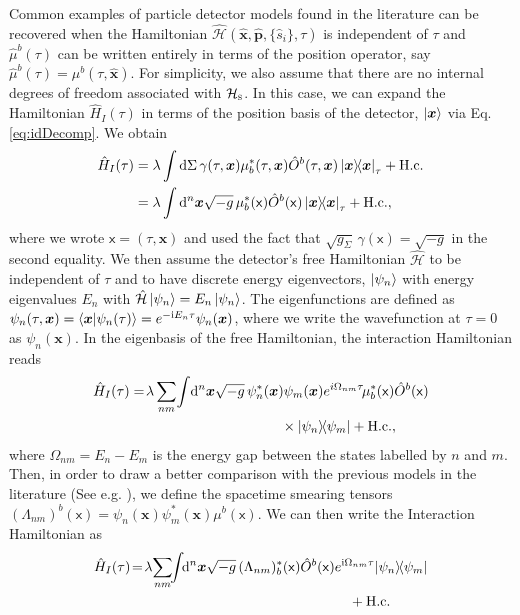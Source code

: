 \documentclass[prd,twocolumn,superscriptaddress,floatfix,amsmath,amssymb,amsfonts,longbibliography,nofootinbib]{revtex4-1}
\newcommand{\mf}{\mathsf}%
\newcommand{\ii}{\mathrm{i}}
\begin{document}
Common examples of particle detector models found in the literature can be recovered when the Hamiltonian $\hat{\mathcal{H}}(\hat{\bm x},\hat{\bm p},\{\hat{s}_i\},\tau)$ is independent of $\tau$ and $\hat{\mu}^b(\tau)$ can be written entirely in terms of the position operator, say $\hat{\mu}^b(\tau) = \mu^b(\tau,\hat{\bm x})$. For simplicity, we also assume that there are no internal degrees of freedom associated with $\mathcal{H}_\textsc{s}$. In this case, we can expand the Hamiltonian $\hat{H}_I(\tau)$ in terms of the position basis of the detector, $\ket{\bm x}$ via Eq. \eqref{eq:idDecomp}. We obtain
\begin{align}
    \hat{H}_I(\tau) &= \lambda \int \dd \Sigma \,\gamma(\tau,\bm x)  \mu_b^*(\tau,\bm x) \hat{O}^b(\tau,\bm x)\ket{\bm x}\!\!\bra{\bm x}_\tau +\text{H.c.}\nonumber\\
    &= \lambda \int \dd^n \bm x \sqrt{-g}\, \mu_b^*(\mf x) \hat{O}^b(\mf x)\ket{\bm x}\!\!\bra{\bm x}_\tau  +\text{H.c.},
\end{align}
where we wrote $\mf x = (\tau,\bm x)$ and used the fact that $\sqrt{g_\Sigma}\,\gamma(\mf x) = \sqrt{-g}$ in the second equality. We then assume the detector's free Hamiltonian $\hat{\mathcal{H}}$ to be independent of $\tau$ and to have discrete energy eigenvectors, $\ket{\psi_n}$ with energy eigenvalues $E_n$ with $\hat{\mathcal{H}}\ket{\psi_n} = E_n \ket{\psi_n}$. The eigenfunctions are defined as $\psi_n(\tau,\bm x) = \braket{\bm x}{\psi_n(\tau)} = e^{-\ii E_n \tau}\psi_n(\bm x)$, where we write the wavefunction at $\tau = 0$ as $\psi_n(\bm x)$. In the eigenbasis of the free Hamiltonian, the interaction Hamiltonian reads
\begin{align}
    \hat{H}_I(\tau) &= \!\lambda \sum_{nm}\!\int\! \dd^n \bm x \sqrt{-g}\, \psi_n^*(\bm x)\psi_m(\bm x)e^{i\Omega_{nm}\tau}\!\mu_b^*(\mf x) \hat{O}^b(\mf x)\nonumber\\
    &\,\,\,\,\,\,\,\,\,\,\,\,\,\,\,\,\,\,\,\,\,\,\,\,\,\,\,\,\,\,\,\,\,\,\,\,\,\,\,\,\,\,\,\,\,\,\,\,\,\,\,\,\,\,\,\,\,\,\,\,\,\,\,\,\,\times\ket{\psi_n}\!\!\bra{\psi_m}+\text{H.c.},
\end{align}
where $\Omega_{nm} = E_n - E_m$ is the energy gap between the states labelled by $n$ and $m$. Then, in order to draw a better comparison with the previous models in the literature (See e.g. \cite{us,us2,mine}), we define the spacetime smearing tensors $(\Lambda_{nm})^b(\mf x) = \psi_n(\bm x)\psi_m^*(\bm x)\mu^b(\mf x)$. We can then write the Interaction Hamiltonian as
\begin{align}\label{eq:Henergybasis}
    \hat{H}_I(\tau)\! &= \!\lambda\! \sum_{nm}\!\!\int \!\!\dd^n \bm x \sqrt{-g}\,(\Lambda_{nm})_b^*(\mf x) \hat{O}^b(\mf x)e^{\ii\Omega_{nm}\tau}\!\ket{\psi_n}\!\!\bra{\psi_m}\nonumber \\&\,\,\,\,\,\,\,\,\,\,\,\,\,\,\,\,\,\,\,\,\,\,\,\,\,\,\,\,\,\,\,\,\,\,\,\,\,\,\,\,\,\,\,\,\,\,\,\,\,\,\,\,\,\,\,\,\,\,\,\,\,\,\,\,\,\,\,\,\,\,\,\,\,\,\,\,\,\,\,\,\,\,\,\,\,\,\,\,\,\,\,\,\,\,\,+\text{H.c.}
\end{align}
\end{document}
